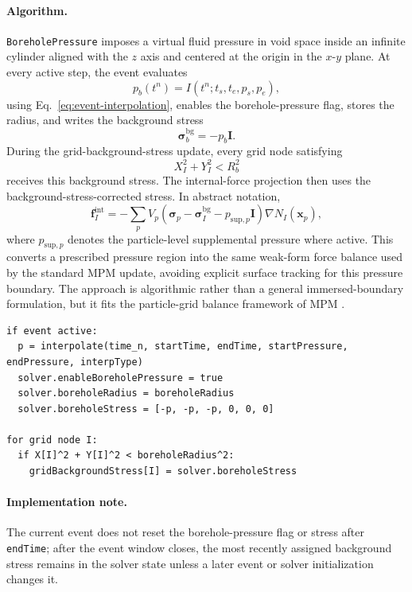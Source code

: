 \paragraph{Algorithm.}
\texttt{BoreholePressure} imposes a virtual fluid pressure in void space inside an infinite cylinder aligned with the $z$ axis and centered at the origin in the $x$-$y$ plane.  At every active step, the event evaluates
\begin{equation}
  p_b(t^n)=I(t^n;t_s,t_e,p_s,p_e),
\end{equation}
using Eq.~\eqref{eq:event-interpolation}, enables the borehole-pressure flag, stores the radius, and writes the background stress
\begin{equation}
  \boldsymbol{\sigma}^{\mathrm{bg}}_b = -p_b\mathbf{I}.
\end{equation}
During the grid-background-stress update, every grid node satisfying
\begin{equation}
  X_I^2+Y_I^2 < R_b^2
\end{equation}
receives this background stress.  The internal-force projection then uses the background-stress-corrected stress.  In abstract notation,
\begin{equation}
  \mathbf{f}^{\mathrm{int}}_I
  = -\sum_p V_p\left(\boldsymbol{\sigma}_p-\boldsymbol{\sigma}^{\mathrm{bg}}_I-p_{\mathrm{sup},p}\mathbf{I}\right)\nabla N_I(\mathbf{x}_p),
  \label{eq:background-stress-force}
\end{equation}
where $p_{\mathrm{sup},p}$ denotes the particle-level supplemental pressure where active.  This converts a prescribed pressure region into the same weak-form force balance used by the standard MPM update, avoiding explicit surface tracking for this pressure boundary.  The approach is algorithmic rather than a general immersed-boundary formulation, but it fits the particle-grid balance framework of MPM \cite{sulsky1994history,sulsky1995solid}.

\begin{lstlisting}[caption={BoreholePressure event pseudocode.}]
if event active:
  p = interpolate(time_n, startTime, endTime, startPressure, endPressure, interpType)
  solver.enableBoreholePressure = true
  solver.boreholeRadius = boreholeRadius
  solver.boreholeStress = [-p, -p, -p, 0, 0, 0]

for grid node I:
  if X[I]^2 + Y[I]^2 < boreholeRadius^2:
    gridBackgroundStress[I] = solver.boreholeStress
\end{lstlisting}

\paragraph{Implementation note.}
The current event does not reset the borehole-pressure flag or stress after \texttt{endTime}; after the event window closes, the most recently assigned background stress remains in the solver state unless a later event or solver initialization changes it.

